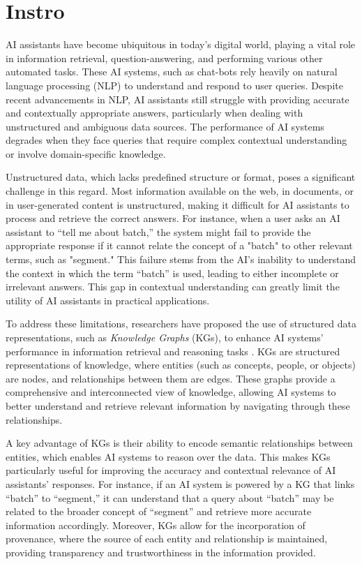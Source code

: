 \section{Instro}

AI assistants have become ubiquitous in today's digital world, playing a vital role in information retrieval, question-answering, and performing various other automated tasks. These AI systems, such as chat-bots rely heavily on natural language processing (NLP) to understand and respond to user queries. Despite recent advancements in NLP, AI assistants still struggle with providing accurate and contextually appropriate answers, particularly when dealing with unstructured and ambiguous data sources. The performance of AI systems degrades when they face queries that require complex contextual understanding or involve domain-specific knowledge.

 Unstructured data, which lacks predefined structure or format, poses a significant challenge in this regard. Most information available on the web, in documents, or in user-generated content is unstructured, making it difficult for AI assistants to process and retrieve the correct answers. For instance, when a user asks an AI assistant to ``tell me about batch,'' the system might fail to provide the appropriate response if it cannot relate the concept of a "batch" to other relevant terms, such as "segment." This failure stems from the AI's inability to understand the context in which the term ``batch'' is used, leading to either incomplete or irrelevant answers. This gap in contextual understanding can greatly limit the utility of AI assistants in practical applications.

To address these limitations, researchers have proposed the use of structured data representations, such as \emph{Knowledge Graphs} (KGs), to enhance AI systems' performance in information retrieval and reasoning tasks \citep{hogan2021knowledge}. KGs are structured representations of knowledge, where entities (such as concepts, people, or objects) are nodes, and relationships between them are edges. These graphs provide a comprehensive and interconnected view of knowledge, allowing AI systems to better understand and retrieve relevant information by navigating through these relationships.

A key advantage of KGs is their ability to encode semantic relationships between entities, which enables AI systems to reason over the data. This makes KGs particularly useful for improving the accuracy and contextual relevance of AI assistants' responses. For instance, if an AI system is powered by a KG that links ``batch'' to ``segment,'' it can understand that a query about ``batch'' may be related to the broader concept of ``segment'' and retrieve more accurate information accordingly. Moreover, KGs allow for the incorporation of provenance, where the source of each entity and relationship is maintained, providing transparency and trustworthiness in the information provided.

